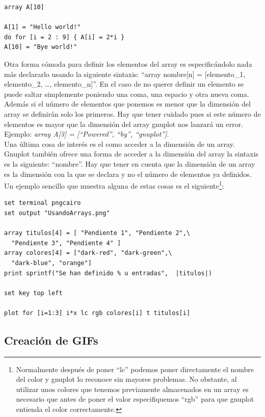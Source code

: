 \documentclass[11pt,a4paper,twoside,pdf]{article}
\numberwithin{equation}{section}
\begin{document}
\begin{lstlisting}[language=Gnuplot]
array A[10]

A[1] = "Hello world!"
do for [i = 2 : 9] { A[i] = 2*i }
A[10] = "Bye world!"
\end{lstlisting}

Otra forma cómoda para definir los elementos del array es especificándolo nada más declararlo usando la siguiente sintaxis: ``array nombre[n] = [elemento\_1, elemento\_2, \ldots, elemento\_n]''. En el caso de no querer definir un elemento se puede saltar simplemente poniendo una coma, una espacio y otra nueva coma. Además si el número de elementos que ponemos es menor que la dimensión del array se definirán solo los primeros. Hay que tener cuidado pues si este número de elementos es mayor que la dimensión del array gnuplot nos lanzará un error. Ejemplo: \textit{array A[3] = [``Powered'', ``by'', ``gnuplot'']}. \\

Una última cosa de interés es el como acceder a la dimensión de un array. Gnuplot también ofrece una forma de acceder a la dimensión del array la sintaxis es la siguiente: ``\textbar nombre\hspace{-0.5px}\textbar''. Hay que tener en cuenta que la dimensión de un array es la dimensión con la que se declara y no el número de elementos ya definidos. Un ejemplo sencillo que muestra alguna de estas cosas es el siguiente\footnote{Normalmente después de poner ``lc'' podemos poner directamente el nombre del color y gnuplot lo reconoce sin mayores problemas. No obstante, al utilizar unos colores que tenemos previamente almacenados en un array es necesario que antes de poner el valor especifiquemos ``rgb'' para que gnuplot entienda el color correctamente.}:

\begin{lstlisting}[language=Gnuplot]
set terminal pngcairo
set output "UsandoArrays.png"

array titulos[4] = [ "Pendiente 1", "Pendiente 2",\
  "Pendiente 3", "Pendiente 4" ]
array colores[4] = ["dark-red", "dark-green",\
  "dark-blue", "orange"]
print sprintf("Se han definido % u entradas",  |titulos|)

set key top left

plot for [i=1:3] i*x lc rgb colores[i] t titulos[i]
\end{lstlisting}

\subsection{Creación de GIFs}
\end{document}
